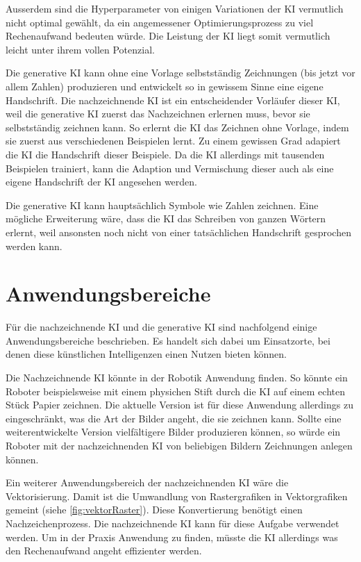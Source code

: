 Ausserdem sind die Hyperparameter von einigen Variationen der KI vermutlich
nicht optimal gewählt, da ein angemessener Optimierungsprozess zu viel
Rechenaufwand bedeuten würde. Die Leistung der KI liegt somit vermutlich leicht
unter ihrem vollen Potenzial.

Die generative KI kann ohne eine Vorlage selbstständig Zeichnungen (bis jetzt
vor allem Zahlen) produzieren und entwickelt so in gewissem Sinne eine eigene
Handschrift. Die nachzeichnende KI ist ein entscheidender Vorläufer dieser KI,
weil die generative KI zuerst das Nachzeichnen erlernen muss, bevor sie
selbstständig zeichnen kann. So erlernt die KI das Zeichnen ohne Vorlage, indem
sie zuerst aus verschiedenen Beispielen lernt. Zu einem gewissen Grad adapiert
die KI die Handschrift dieser Beispiele. Da die KI allerdings mit tausenden
Beispielen trainiert, kann die Adaption und Vermischung dieser auch als eine
eigene Handschrift der KI angesehen werden.

Die generative KI kann hauptsächlich Symbole wie Zahlen zeichnen. Eine mögliche
Erweiterung wäre, dass die KI das Schreiben von ganzen Wörtern erlernt, weil
ansonsten noch nicht von einer tatsächlichen Handschrift gesprochen werden kann.


\section{Anwendungsbereiche}\label{chap:d_anwendung} Für die nachzeichnende KI
und die generative KI sind nachfolgend einige Anwendungsbereiche beschrieben. Es
handelt sich dabei um Einsatzorte, bei denen diese künstlichen Intelligenzen
einen Nutzen bieten können.

Die Nachzeichnende KI könnte in der Robotik Anwendung finden. So könnte ein
Roboter beispielsweise mit einem physichen Stift durch die KI auf einem echten
Stück Papier zeichnen. Die aktuelle Version ist für diese Anwendung allerdings
zu eingeschränkt, was die Art der Bilder angeht, die sie zeichnen kann. Sollte
eine weiterentwickelte Version vielfältigere Bilder produzieren können, so würde
ein Roboter mit der nachzeichnenden KI von beliebigen Bildern Zeichnungen
anlegen können.

Ein weiterer Anwendungsbereich der nachzeichnenden KI wäre die Vektorisierung.
Damit ist die Umwandlung von Rastergrafiken in Vektorgrafiken gemeint (siehe
\autoref{fig:vektorRaster}). Diese Konvertierung benötigt einen
Nachzeichenprozess. Die nachzeichnende KI kann für diese Aufgabe verwendet
werden. Um in der Praxis Anwendung zu finden, müsste die KI allerdings was den
Rechenaufwand angeht effizienter werden.

